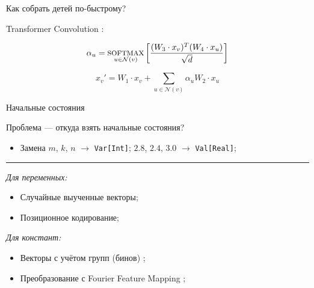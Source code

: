 \documentclass[14pt,aspectratio=169,hyperref={pdftex,unicode},xcolor=dvipsnames]{beamer}
\newcommand{\fakesc}[1]{\uppercase{{\footnotesize #1}}}
\renewcommand{\textsc}{\fakesc}
\begin{document}
\begin{frame}{Как собрать детей по-быстрому?}

Transformer Convolution \cite{transformer-conv-paper}:

\begin{equation*}
  \alpha_{u} = \underset{u \in \mathcal{N}(v)}{\text{\textsc{softmax}}} \left[\frac{(W_3 \cdot x_v)^T (W_4 \cdot x_u)}{\sqrt d} \right]
\end{equation*}

\begin{equation*}
  x_v' = W_1 \cdot x_v + \sum_{u \in \mathcal{N}(v)} \alpha_u W_2 \cdot x_u
\end{equation*}

\end{frame}



\begin{frame}{Начальные состояния}

Проблема --- откуда взять начальные состояния?

\begin{itemize}
  \item Замена $m$, $k$, $n$ $\rightarrow$ \texttt{Var[Int]}; \hfill $2.8$, $2.4$, $3.0$ $\rightarrow$ \texttt{Val[Real]};
\end{itemize}

\vspace{1mm}\hrule\vspace{1mm}

\begin{minipage}{0.5\textwidth}

\textit{Для переменных:}

\begin{itemize}
  \item Случайные выученные векторы;
  \item Позиционное кодирование;
\end{itemize}

\end{minipage}%
\begin{minipage}{0.5\textwidth}

\textit{Для констант:}

\begin{itemize}
  \item Векторы с учётом групп (бинов) \cite{embeddings-for-numerical-features-paper};
  \item Преобразование с Fourier Feature Mapping \cite{embeddings-for-numerical-features-paper};
\end{itemize}

\end{minipage}

\end{frame}
\end{document}
